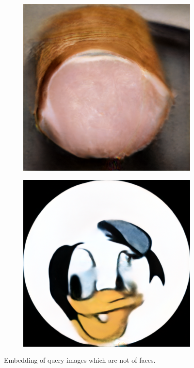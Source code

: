 \begin{figure}[h!]
    \begin{subfigure}[b]{0.24\textwidth}
        \includegraphics[width=\textwidth]{fig/stylegan/noface/skinkerecon}
    \end{subfigure}
    \begin{subfigure}[b]{0.24\textwidth}
        \includegraphics[width=\textwidth]{fig/stylegan/noface/andrecon}
    \end{subfigure}
    \caption{Embedding of query images which are not of faces.}
    \label{noface}
\end{figure}

